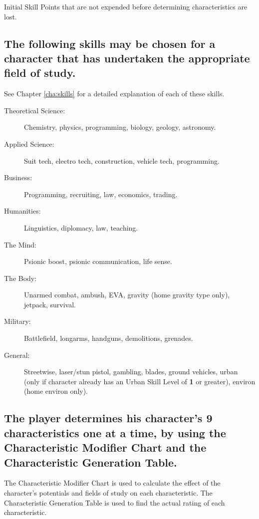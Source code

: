 Initial Skill Points that are not expended before determining
characteristics are lost.


\subsection[Initial Skills]{The following skills may be chosen for a
  character that has undertaken the appropriate field of study.}
\label{sec:fos-skills}

See Chapter \ref{cha:skills} for a detailed explanation of each of these
skills.

\begin{description}
\item[Theoretical Science:] Chemistry, physics, programming, biology,
  geology, astronomy.
\item[Applied Science:] Suit tech, electro tech, construction, vehicle
  tech, programming.
\item[Business:] Programming, recruiting, law, economics, trading.
\item[Humanities:] Linguistics, diplomacy, law, teaching.
\item[The Mind:] Psionic boost, psionic communication, life sense.
\item[The Body:] Unarmed combat, ambush, EVA, gravity (home gravity
  type only), jetpack, survival.
\item[Military:] Battlefield, longarms, handguns, demolitions,
  grenades.
\item[General:] Streetwise, laser/stun pistol, gambling, blades,
  ground vehicles, urban (only if character already has an Urban Skill
  Level of \textbf{1} or greater), environ (home environ only).
\end{description}


\subsection[Generating Characteristics]{The player determines his
  character's 9 characteristics one at a time, by using the
  Characteristic Modifier Chart and the Characteristic Generation
  Table.}
\label{sec:characteristics}


The Characteristic Modifier Chart is used to calculate the effect of
the character's potentials and fields of study on each characteristic.
The Characteristic Generation Table is used to find the actual rating
of each characteristic.

